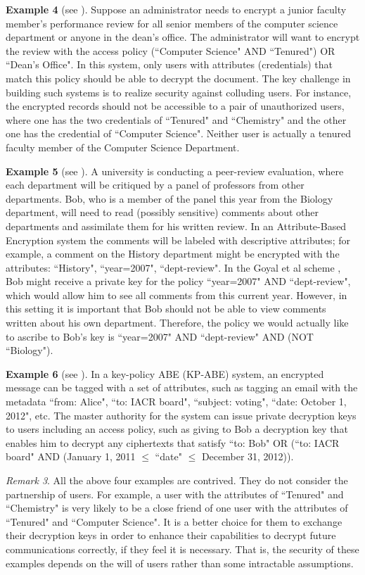\documentclass[11pt]{article}
\begin{document}
\textbf{Example 4} (see \cite{LWa11}). Suppose an administrator
needs to encrypt a junior faculty member's performance review for all senior members of the
computer science department or anyone in the dean's office. The administrator will want to
encrypt the review with the access policy (``Computer Science" AND ``Tenured") OR
``Dean's Office". In this system, only users with attributes (credentials) that match this
policy should be able to decrypt the document. The key challenge in building such systems is
to realize security against colluding users. For instance, the encrypted records should not be
accessible to a pair of unauthorized users, where one has the two credentials of ``Tenured" and ``Chemistry" and
the other one has the credential of ``Computer Science". Neither
user is actually a tenured faculty member of the Computer Science Department.

\textbf{Example 5} (see \cite{OSW07}). A university
is conducting a peer-review evaluation, where each department will be critiqued by a panel of
professors from other departments. Bob, who is a member of the panel this year from the Biology
department, will need to read (possibly sensitive) comments about other departments and assimilate
them for his written review. In an Attribute-Based Encryption system the comments will be labeled
with descriptive attributes; for example, a comment on the History department might be encrypted
with the attributes: ``History", ``year=2007", ``dept-review". In the Goyal et al scheme \cite{PTMW06},  Bob
might receive a private key for the policy ``year=2007" AND ``dept-review", which would
allow him to see all comments from this current year. However, in this setting it is important that
Bob should not be able to view comments written about his own department. Therefore, the policy
we would actually like to ascribe to Bob's key is ``year=2007" AND ``dept-review" AND
(NOT ``Biology").

\textbf{Example 6} (see \cite{HW14}). In a key-policy ABE (KP-ABE) system,
an encrypted message can be tagged with a set of attributes, such as tagging an email with the
metadata ``from: Alice", ``to: IACR board", ``subject: voting", ``date: October 1, 2012", etc. The
master authority for the system can issue private decryption keys to users including an access
policy, such as giving to Bob a decryption key that enables him to decrypt any ciphertexts that
satisfy ``to: Bob" OR (``to: IACR board" AND (January 1, 2011 $\leq$ ``date" $\leq$ December 31, 2012)).

\emph{Remark 3}. All the above four examples are contrived. They do not consider the partnership of users. For example, a user with the attributes of ``Tenured" and ``Chemistry" is very likely to be a close friend of one user with the attributes of ``Tenured" and ``Computer Science". It is a better choice for them to exchange their decryption keys in order to enhance their capabilities to decrypt future communications correctly, if they feel it is necessary. That is, the security of these examples depends on the will of users rather than some intractable assumptions.
\end{document}
